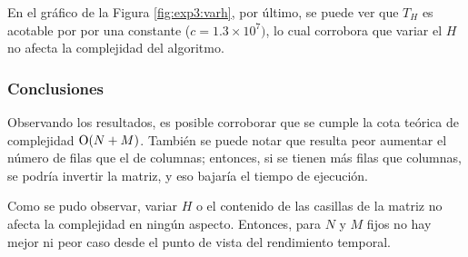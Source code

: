 	En el gráfico de la Figura \ref{fig:exp3:varh}, por último, se puede ver que
	$T_H$ es acotable por por una constante ($c = 1.3 \times 10^7)$, lo cual corrobora que variar el $H$
	no afecta la complejidad del algoritmo.

	\subsubsection{Conclusiones}

	Observando los resultados, es posible corroborar que se cumple la cota
	teórica de complejidad $\operatorname{O}(N + M)$. También se puede notar que resulta
	peor aumentar el número de filas que el de columnas; entonces, si se
	tienen más filas que columnas, se podría invertir la matriz, y eso bajaría
	el tiempo de ejecución.

	Como se pudo observar, variar $H$ o el contenido de las casillas de la
	matriz no afecta la complejidad en ningún aspecto. Entonces, para $N$ y
	$M$ fijos no hay mejor ni peor caso desde el punto de vista del
	rendimiento temporal.
